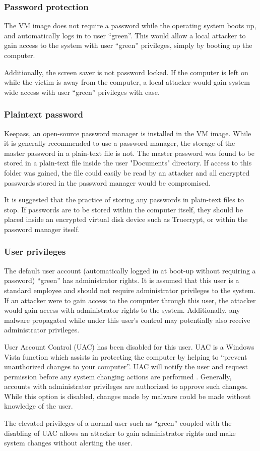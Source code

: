 \subsubsection{Password protection}

The VM image does not require a password while the operating system boots up, and automatically logs in to user ``green''. This would allow a local attacker to gain access to the system with user ``green'' privileges, simply by booting up the computer.

Additionally, the screen saver is not password locked. If the computer is left on while the victim is away from the computer, a local attacker would gain system wide access with user ``green'' privileges with ease.

\subsubsection{Plaintext password}

Keepass, an open-source password manager is installed in the VM image. While it is generally recommended to use a password manager, the storage of the master password in a plain-text file is not. The master password was found to be stored in a plain-text file inside the user "Documents" directory. If access to this folder was gained, the file could easily be read by an attacker and all encrypted passwords stored in the password manager would be compromised.

It is suggested that the practice of storing any passwords in plain-text files to stop. If passwords are to be stored within the computer itself, they should be placed inside an encrypted virtual disk device such as Truecrypt, or within the password manager itself.

\subsubsection{User privileges}

The default user account (automatically logged in at boot-up without requiring a password) ``green'' has administrator rights. It is assumed that this user is a standard employee and should not require administrator privileges to the system. If an attacker were to gain access to the computer through this user, the attacker would gain access with administrator rights to the system. Additionally, any malware propagated while under this user's control may potentially also receive administrator privileges.

User Account Control (UAC) has been disabled for this user. UAC is a Windows Vista function which assists in protecting the computer by helping to ``prevent unauthorized changes to your computer''. UAC will notify the user and request permission before any system changing actions are performed \citep{MicrosoftUAC}. Generally, accounts with administrator privileges are authorized to approve such changes. While this option is disabled, changes made by malware could be made without knowledge of the user.

The elevated privileges of a normal user such as ``green'' coupled with the disabling of UAC allows an attacker to gain administrator rights and make system changes without alerting the user.